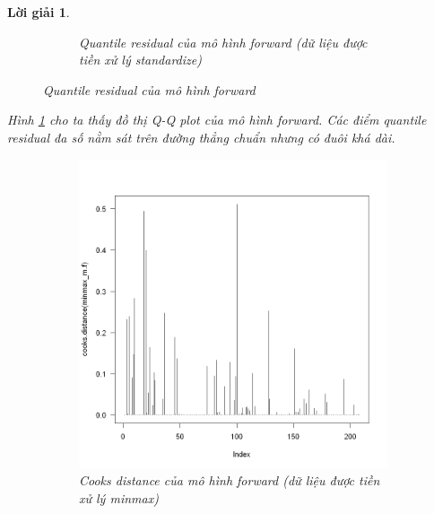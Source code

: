 \documentclass[14pt, a4paper]{article}
\theoremstyle{sltheorem}
\theoremstyle{soltheorem}
\newtheorem*{loigiai}{Lời giải}
\begin{document}
\begin{loigiai}
\begin{figure}[h!]
\begin{subfigure}[b]{0.4\textwidth}
            \caption{Quantile residual của mô hình forward (dữ liệu được tiền xử lý standardize)}
        \end{subfigure}
        \caption{Quantile residual của mô hình forward}
        \label{fig:Quantile-resid-mf}
    \end{figure}

    Hình \ref{fig:Quantile-resid-mf} cho ta thấy đồ thị Q-Q plot của mô hình forward.
    Các điểm quantile residual đa số nằm sát trên đường thẳng chuẩn nhưng có đuôi khá dài.

    \begin{figure}[h!]
        \centering
        \begin{subfigure}[b]{0.4\textwidth}
            \centering
            \includegraphics[width=\textwidth]{figures/minmax_mf_cooks.png}
            \caption{Cooks distance của mô hình forward (dữ liệu được tiền xử lý minmax)}
        \end{subfigure}
        \hfill
        \begin{subfigure}[b]{0.4\textwidth}
            \centering

\end{subfigure}
\end{figure}
\end{loigiai}
\end{document}
